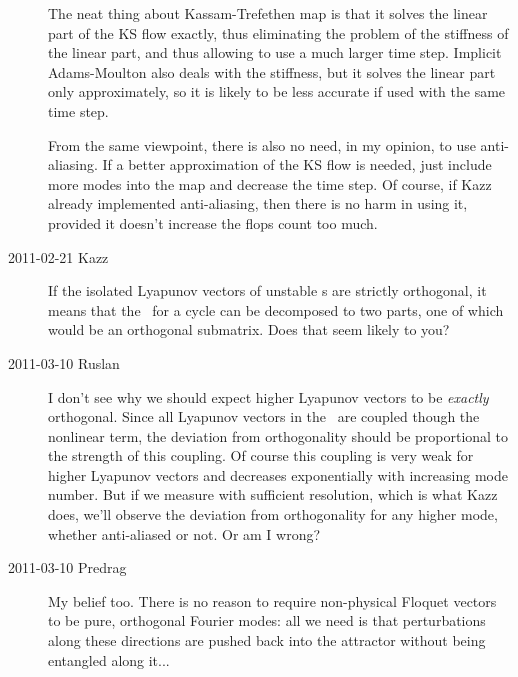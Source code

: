 \begin{description}
The neat thing about Kassam-Trefethen map is that it solves the linear part of the KS flow exactly, thus eliminating the problem of the stiffness of the linear part, and thus allowing to use a much larger time step.  Implicit Adams-Moulton also deals with the stiffness, but it solves the linear part only approximately, so it is likely to be less accurate if used with the same time step.

From the same viewpoint, there is also no need, in my opinion, to use anti-aliasing.  If a better approximation of the KS flow is needed, just include more modes into the map and decrease the time step.  Of course, if Kazz already implemented anti-aliasing, then there is no harm in using it, provided it doesn't increase the flops count too much.

\item[2011-02-21 Kazz]
If the isolated Lyapunov vectors of
{unstable \po}s are strictly orthogonal, it means that the \jacobianM\ for a
cycle can be decomposed to two parts, one of which would be an
orthogonal submatrix. Does that seem likely to you?

\item[2011-03-10 Ruslan]
I don't see why we should expect higher Lyapunov vectors to be {\em exactly} orthogonal.  Since all Lyapunov vectors in the \KSe\ are coupled though the nonlinear term, the deviation from orthogonality should be proportional to the strength of this coupling.  Of course this coupling is very weak for higher Lyapunov vectors and decreases exponentially with increasing mode number.  But if we measure with sufficient resolution, which is what Kazz does, we'll observe the deviation from orthogonality for any higher mode, whether anti-aliased or not.  Or am I wrong?

\item[2011-03-10 Predrag] My belief too. There is no reason to require non-physical Floquet vectors to be pure, orthogonal Fourier modes: all
    we need is that perturbations along these directions are pushed back into
    the attractor without being entangled along it...


\end{description}
